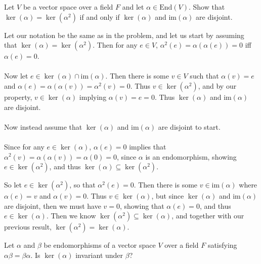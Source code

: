 \documentclass{article}
\begin{document}
\begin{problem}
Let $V$ be a vector space over a field $F$ and let $\alpha\in\text{End}(V)$. Show that $\ker(\alpha) = \ker(\alpha^{2})$ if and only if $\ker(\alpha)$ and $\text{im}(\alpha)$ are disjoint.
\end{problem}

\begin{solution}
Let our notation be the same as in the problem, and let us start by assuming that $\ker(\alpha) = \ker(\alpha^{2})$. Then for any $e\in V$, $\alpha^{2}(e)=\alpha(\alpha(e))=0$ iff $\alpha(e)=0$.

\paragraph{}
Now let $e \in \ker(\alpha) \cap \text{im}(\alpha)$. Then there is some $v\in V$ such that $\alpha(v)=e$ and $\alpha(e)=\alpha(\alpha(v))=\alpha^{2}(v)=0$. Thus $v\in\ker(\alpha^{2})$, and by our property, $v\in\ker(\alpha)$ implying $\alpha(v)=e=0$. Thus $\ker(\alpha)$ and $\text{im}(\alpha)$ are disjoint.

\paragraph{}
Now instead assume that $\ker(\alpha)$ and $\text{im}(\alpha)$ are disjoint to start.

\paragraph{}
Since for any $e\in\ker(\alpha)$, $\alpha(e)=0$ implies that $\alpha^{2}(v)=\alpha(\alpha(v))=\alpha(0)=0$, since $\alpha$ is an endomorphism, showing $e\in\ker(\alpha^{2})$, and thus $\ker(\alpha) \subseteq \ker(\alpha^{2})$.

So let $e\in\ker(\alpha^{2})$, so that $\alpha^{2}(e)=0$. Then there is some $v\in\text{im}(\alpha)$ where $\alpha(e)=v$ and $\alpha(v)=0$. Thus $v\in\ker(\alpha)$, but since $\ker(\alpha)$ and $\text{im}(\alpha)$ are disjoint, then we must have $v=0$, showing that $\alpha(e)=0$, and thus $e\in\ker(\alpha)$. Then we know $\ker(\alpha^{2}) \subseteq \ker(\alpha)$, and together with our previous result, $\ker(\alpha^{2}) = \ker(\alpha)$.
\end{solution}

\setcounter{problem}{378}
\begin{problem}
Let $\alpha$ and $\beta$ be endomorphisms of a vector space $V$ over a field $F$ satisfying $\alpha\beta = \beta\alpha$. Is $\ker(\alpha)$ invariant under $\beta$?
\end{problem}
\end{document}
